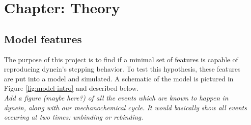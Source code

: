 \documentclass[10pt]{article} %
\begin{document}
\section{Chapter: Theory}
\subsection{Model features}
The purpose of this project is to find if a minimal set of features is capable of reproducing dynein's stepping behavior. To test this hypothesis, these features are put into a model and simulated. A schematic of the model is pictured in Figure \ref{fig:model-intro} and described below.\\

\textit{Add a figure (maybe here?) of all the events which are known to happen in dynein, along with our mechanochemical cycle. It would basically show all events occuring at two times: unbinding or rebinding.}\\


\end{document}
